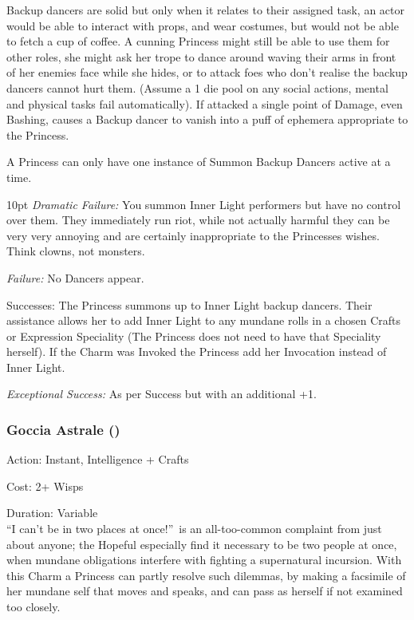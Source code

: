 Backup dancers are solid but only when it relates to their assigned task, an actor would be able to interact with props, and wear costumes, but would not be able to fetch a cup of coffee. A cunning Princess might still be able to use them for other roles, she might ask her trope to dance around waving their arms in front of her enemies face while she hides, or to attack foes who don't realise the backup dancers cannot hurt them. (Assume a 1 die pool on any social actions, mental and physical tasks fail automatically). If attacked a single point of Damage, even Bashing, causes a Backup dancer to vanish into a puff of ephemera appropriate to the Princess.

A Princess can only have one instance of Summon Backup Dancers active at a time.

\begin{myindentpar}{10pt}     \emph{Dramatic Failure:} You summon Inner Light performers but have no control over them. They immediately run riot, while not actually harmful they can be very very annoying and are certainly inappropriate to the Princesses wishes. Think clowns, not monsters.

    \emph{Failure:} No Dancers appear.

    Successes: The Princess summons up to Inner Light backup dancers. Their assistance allows her to add Inner Light to any mundane rolls in a chosen Crafts or Expression Speciality (The Princess does not need to have that Speciality herself). If the Charm was Invoked the Princess add her Invocation instead of Inner Light.

    \emph{Exceptional Success:} As per Success but with an additional +1.\end{myindentpar}

\subsubsection*{Goccia Astrale (\textbullet\textbullet\textbullet)}
\noindent Action: Instant, Intelligence + Crafts 

\noindent Cost: 2+ Wisps

\noindent Duration: Variable\\ 

\noindent \textquotedblleft I can't be in two places at once!\textquotedblright\, is an all-too-common complaint from just about anyone; the Hopeful especially find it necessary to be two people at once, when mundane obligations interfere with fighting a supernatural incursion. With this Charm a Princess can partly resolve such dilemmas, by making a facsimile of her mundane self that moves and speaks, and can pass as herself if not examined too closely.

